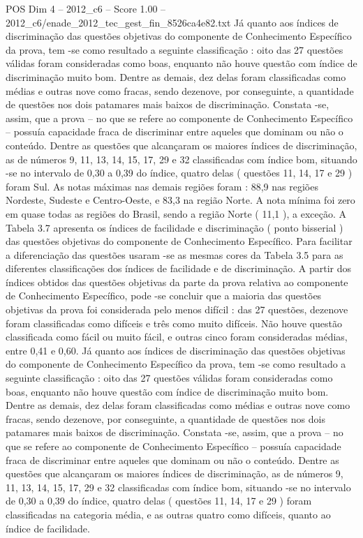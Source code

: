 \begin{textsample}{POS Dim 4 – 2012\_c6 – Score 1.00 – 2012\_c6/enade\_2012\_tec\_gest\_fin\_8526ca4e82.txt}
Já quanto aos índices de discriminação das questões objetivas do componente de Conhecimento Específico da prova, tem -se como resultado a seguinte classificação : oito das 27 questões válidas foram consideradas como boas, enquanto não houve questão com índice de discriminação muito bom.
Dentre as demais, dez delas foram classificadas como médias e outras nove como fracas, sendo dezenove, por conseguinte, a quantidade de questões nos dois patamares mais baixos de discriminação.
Constata -se, assim, que a prova – no que se refere ao componente de Conhecimento Específico – possuía capacidade fraca de discriminar entre aqueles que dominam ou não o conteúdo.
Dentre as questões que alcançaram os maiores índices de discriminação, as de números 9, 11, 13, 14, 15, 17, 29 e 32 classificadas com índice bom, situando -se no intervalo de 0,30 a 0,39 do índice, quatro delas ( questões 11, 14, 17 e 29 ) foram Sul.
As notas máximas nas demais regiões foram : 88,9 nas regiões Nordeste, Sudeste e Centro-Oeste, e 83,3 na região Norte.
A nota mínima foi zero em quase todas as regiões do Brasil, sendo a região Norte ( 11,1 ), a exceção.
A Tabela 3.7 apresenta os índices de facilidade e discriminação ( ponto bisserial ) das questões objetivas do componente de Conhecimento Específico.
Para facilitar a diferenciação das questões usaram -se as mesmas cores da Tabela 3.5 para as diferentes classificações dos índices de facilidade e de discriminação.
A partir dos índices obtidos das questões objetivas da parte da prova relativa ao componente de Conhecimento Específico, pode -se concluir que a maioria das questões objetivas da prova foi considerada pelo menos difícil : das 27 questões, dezenove foram classificadas como difíceis e três como muito difíceis.
Não houve questão classificada como fácil ou muito fácil, e outras cinco foram consideradas médias, entre 0,41 e 0,60.
Já quanto aos índices de discriminação das questões objetivas do componente de Conhecimento Específico da prova, tem -se como resultado a seguinte classificação : oito das 27 questões válidas foram consideradas como boas, enquanto não houve questão com índice de discriminação muito bom.
Dentre as demais, dez delas foram classificadas como médias e outras nove como fracas, sendo dezenove, por conseguinte, a quantidade de questões nos dois patamares mais baixos de discriminação.
Constata -se, assim, que a prova – no que se refere ao componente de Conhecimento Específico – possuía capacidade fraca de discriminar entre aqueles que dominam ou não o conteúdo.
Dentre as questões que alcançaram os maiores índices de discriminação, as de números 9, 11, 13, 14, 15, 17, 29 e 32 classificadas com índice bom, situando -se no intervalo de 0,30 a 0,39 do índice, quatro delas ( questões 11, 14, 17 e 29 ) foram classificadas na categoria média, e as outras quatro como difíceis, quanto ao índice de facilidade.

\end{textsample}
